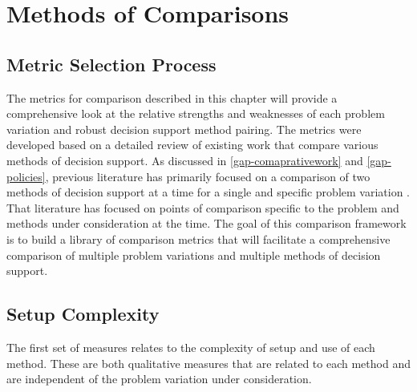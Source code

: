 \chapter{Methods of Comparisons}
\label{dev-comparisons}

\begin{abstract}
    This chapter establishes framework for comparing robust decision support methods. This includes several points of comparison, both qualitative and quantitative. Measures will be grouped into categories that indicate the type of information being compared. This includes elements related to the setup and configuration process (\cref{compare-setup}), communication of the strength of results communication (\cref{compare-communication}), and comparisons of the results themselves (\cref{compare-results}).
\end{abstract}

\newpage

\section{Metric Selection Process}\label{compare-intro}
The metrics for comparison described in this chapter will provide a comprehensive look at the relative strengths and weaknesses of each problem variation and robust decision support method pairing. The metrics were developed based on a detailed review of existing work that compare various methods of decision support. As discussed in \cref{gap-comaprativework} and \cref{gap-policies}, previous literature has primarily focused on a comparison of two methods of decision support at a time for a single and specific problem variation \citep{Gersonius2016,Hall2012,Kwakkel2016Compare,Matrosov2013a,Matrosov2013b,Roach2015,Roach2016}. That literature has focused on points of comparison specific to the problem and methods under consideration at the time. The goal of this comparison framework is to build a library of comparison metrics that will facilitate a comprehensive comparison of multiple problem variations and multiple methods of decision support. 

\section{Setup Complexity} \label{compare-setup}
The first set of measures relates to the complexity of setup and use of each method. These are both qualitative measures that are related to each method and are independent of the problem variation under consideration. 


